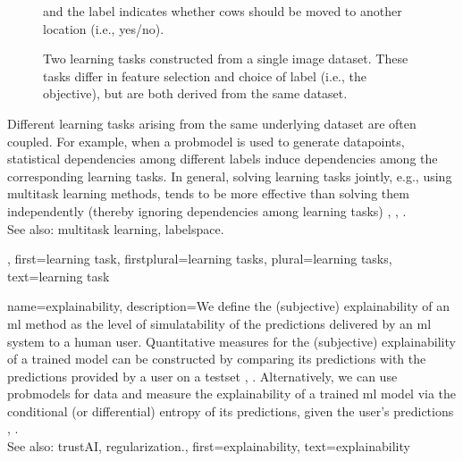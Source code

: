 {{\begin{figure}[H]
\begin{minipage}[t]{0.45\textwidth}
        			and the \gls{label} indicates whether cows should be moved to another location (i.e., yes/no).
			\end{minipage}
			\caption{Two learning tasks constructed from a single image \gls{dataset}. 
			These tasks differ in \gls{feature} selection and choice of \gls{label} (i.e., the objective), 
			but are both derived from the same \gls{dataset}.}
			\label{fig:learning_tasks_cows_dict}
		\end{figure}
		Different learning tasks arising from the same underlying \gls{dataset} are often coupled. 
		For example, when a \gls{probmodel} is used to generate \glspl{datapoint}, statistical 
		dependencies among different \glspl{label} induce dependencies among the corresponding 
		learning tasks. In general, solving learning tasks jointly, e.g., using \gls{multitask learning} 
		methods, tends to be more effective than solving them independently (thereby ignoring 
		dependencies among learning tasks) \cite{Caruana:1997wk}, \cite{JungGaphLassoSPL}, \cite{CSGraphSelJournal}.
	 			\\ 
		See also: \gls{multitask learning}, \gls{labelspace}.},
	first={learning task},
	firstplural={learning tasks},
	plural={learning tasks}, 
	text={learning task}
}

{name={explainability},
	description={We define the (subjective) explainability of an \gls{ml} method 
		as the level of simulatability \cite{Colin:2022aa} of the \glspl{prediction} 
		delivered by an \gls{ml} system to a human user. Quantitative measures for the 
		(subjective) explainability of a trained \gls{model} can be constructed by 
		comparing its \glspl{prediction} with the \glspl{prediction} provided by a user 
		on a \gls{testset} \cite{Colin:2022aa}, \cite{Zhang:2024aa}. Alternatively, we can use 
		\glspl{probmodel} for \gls{data} and measure the explainability of a trained \gls{ml} 
		\gls{model} via the conditional (or differential) \gls{entropy} of its \glspl{prediction}, given the 
		user's \glspl{prediction} \cite{JunXML2020}, \cite{Chen2018}.
						\\ 
		See also: \gls{trustAI}, \gls{regularization}.},
	first={explainability},
	text={explainability}
}

